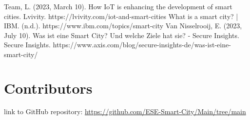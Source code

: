 \documentclass[conference]{IEEEtran}
\begin{document}















\begin{thebibliography}{00}
Team, L. (2023, March 10). How IoT is enhancing the development of smart cities. Lvivity. https://lvivity.com/iot-and-smart-cities
 What is a smart city? | IBM. (n.d.). https://www.ibm.com/topics/smart-city
 Van Nisselrooij, E. (2023, July 10). Was ist eine Smart City? Und welche Ziele hat sie? - Secure Insights. Secure Insights. https://www.axis.com/blog/secure-insights-de/was-ist-eine-smart-city/
\end{thebibliography}

\section*{Contributors}

link to GitHub repository: \url{https://github.com/ESE-Smart-City/Main/tree/main}
\end{document}
